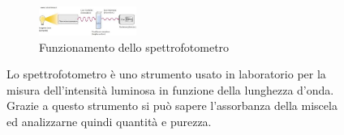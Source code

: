 \documentclass{report}
\begin{document}
\begin{figure}[H]
\begin{subfigure}[b]{1\textwidth}
				\centering
		  	\includegraphics[width=0.35\textwidth]{./immagini/assorbanza.jpeg}
				\caption{Funzionamento dello spettrofotometro}
				\label{assorbanza}

			\end{subfigure}

		\caption{Lo spettrofotometro è uno strumento usato in laboratorio per la misura dell'intensità
		luminosa in funzione della lunghezza d'onda.
		Grazie a questo strumento si pu\`o sapere l'assorbanza della miscela ed analizzarne quindi quantità e purezza.}

	\end{figure}

	\vspace{0.5cm}

	\newpage
	\maketitle
	\vspace{1.5cm}

	\renewcommand*\thesection{\arabic{chapter}.\arabic{section}}


	
	\newpage

	
	\newpage

	
	\newpage

	
	\newpage

	
	\newpage

	
	\newpage

	
	\newpage

	
	\newpage

	
	\newpage

	
	\newpage

	
	\newpage

	
	\newpage
\end{document}
